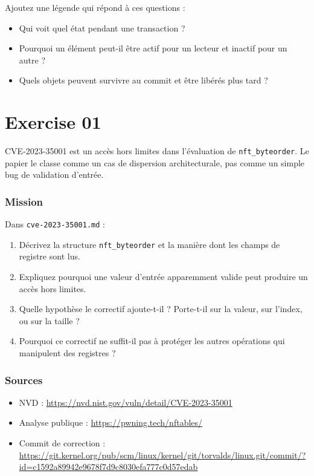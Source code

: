 \documentclass{training}
\begin{document}
Ajoutez une légende qui répond à ces questions :

\begin{itemize}
  \item Qui voit quel état pendant une transaction ?
  \item Pourquoi un élément peut-il être actif pour un lecteur et inactif
        pour un autre ?
  \item Quels objets peuvent survivre au commit et être libérés plus tard ?
\end{itemize}


\chapter{Exercise 01}
\makeheaderfiles

CVE-2023-35001 est un accès hors limites dans l'évaluation de
\texttt{nft\_byteorder}. Le papier le classe comme un cas de dispersion
architecturale, pas comme un simple bug de validation d'entrée.

\subsection*{Mission}

Dans \texttt{cve-2023-35001.md} :

\begin{enumerate}
  \item Décrivez la structure \texttt{nft\_byteorder} et la manière dont
        les champs de registre sont lus.
  \item Expliquez pourquoi une valeur d'entrée apparemment valide peut
        produire un accès hors limites.
  \item Quelle hypothèse le correctif ajoute-t-il ? Porte-t-il sur la
        valeur, sur l'index, ou sur la taille ?
  \item Pourquoi ce correctif ne suffit-il pas à protéger les autres
        opérations qui manipulent des registres ?
\end{enumerate}

\subsection*{Sources}
\begin{itemize}
  \item NVD : \url{https://nvd.nist.gov/vuln/detail/CVE-2023-35001}
  \item Analyse publique :
        \url{https://pwning.tech/nftables/}
  \item Commit de correction :
        \url{https://git.kernel.org/pub/scm/linux/kernel/git/torvalds/linux.git/commit/?id=c1592a89942e9678f7d9c8030efa777c0d57edab}
\end{itemize}
\end{document}
